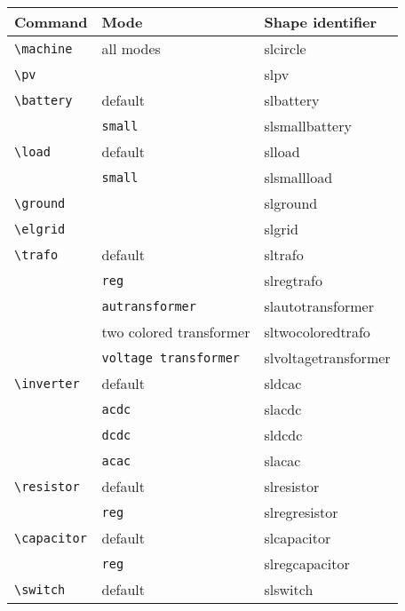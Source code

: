 \documentclass[a4]{article}
\begin{document}
\begin{table}[h]
\centering
 \setlength{\tabcolsep}{1cm}
\begin{tabular}{lll}
\toprule
\toprule
Command & Mode & Shape identifier\\
\midrule
\verb+\machine+        & all modes             & slcircle      \\
\verb+\pv+              &                       & slpv          \\
\verb+\battery+			& default				& slbattery \\
						& \verb+small+ 				& slsmallbattery \\
\verb+\load+            & default                      & slload                \\
            			& \verb+small+          & slsmallload                \\
\verb+\ground+  &                       & slground      \\
\verb+\elgrid+  &                       & slgrid                \\
\verb+\trafo+   & default       & sltrafo       \\      
                                & \verb+reg+            & slregtrafo \\
                                & \verb+autransformer+          & slautotransformer \\
                            & two colored transformer  & sltwocoloredtrafo\\
                                & \verb+voltage transformer+    &slvoltagetransformer\\
\verb+\inverter+        & default       & sldcac                \\
                                & \verb+acdc+           & slacdc                \\
                                & \verb+dcdc+           & sldcdc                \\
                                & \verb+acac+           & slacac                \\
\verb+\resistor+        & default       & slresistor \\
                                & \verb+reg+                    & slregresistor \\
\verb+\capacitor+       & default       & slcapacitor   \\
                                        & \verb+reg+                    & slregcapacitor \\
\verb+\switch+  & default       & slswitch      \\

\end{tabular}
\end{table}
\end{document}
